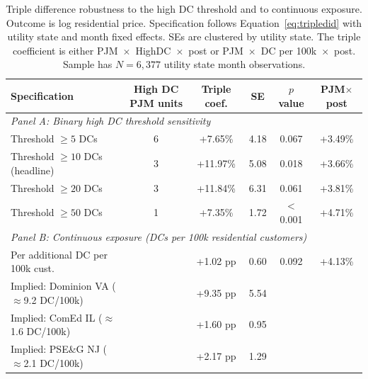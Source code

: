\begin{table}[H]
\centering
\caption{Triple difference robustness to the high DC threshold and to continuous exposure. Outcome is log residential price. Specification follows Equation~\ref{eq:tripledid} with utility state and month fixed effects. SEs are clustered by utility state. The triple coefficient is either PJM~$\times$~HighDC~$\times$~post or PJM~$\times$~DC per 100k~$\times$~post. Sample has $N=6,377$ utility state month observations.}
\label{tab:exposure_robustness}
\small
\setlength{\tabcolsep}{3pt}
\begin{tabular}{p{5.2cm} c c c c c}
\toprule
Specification & High DC PJM units & Triple coef. & SE & $p$ value & PJM$\times$post \\
\midrule
\multicolumn{6}{l}{\textit{Panel A: Binary high DC threshold sensitivity}} \\
\midrule
Threshold $\geq 5$ DCs & 6 & +7.65\% & 4.18 & 0.067 & +3.49\% \\
Threshold $\geq 10$ DCs (headline) & 3 & +11.97\% & 5.08 & 0.018 & +3.66\% \\
Threshold $\geq 20$ DCs & 3 & +11.84\% & 6.31 & 0.061 & +3.81\% \\
Threshold $\geq 50$ DCs & 1 & +7.35\% & 1.72 & $<$0.001 & +4.71\% \\
\midrule
\multicolumn{6}{l}{\textit{Panel B: Continuous exposure (DCs per 100k residential customers)}} \\
\midrule
Per additional DC per 100k cust. &  & +1.02 pp & 0.60 & 0.092 & +4.13\% \\
\quad Implied: Dominion VA ($\approx$9.2 DC/100k) &  & +9.35 pp & 5.54 &  &  \\
\quad Implied: ComEd IL ($\approx$1.6 DC/100k) &  & +1.60 pp & 0.95 &  &  \\
\quad Implied: PSE\&G NJ ($\approx$2.1 DC/100k) &  & +2.17 pp & 1.29 &  &  \\
\bottomrule
\end{tabular}
\end{table}
